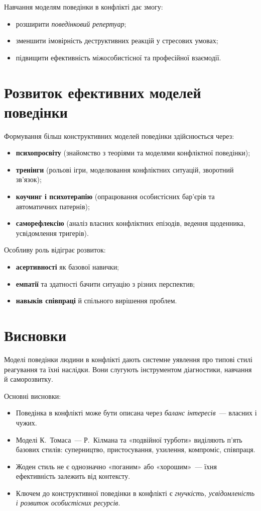 \documentclass[12pt,a4paper]{article}
\begin{document}
    Навчання моделям поведінки в конфлікті дає змогу:
    \begin{itemize}
        \item розширити \textit{поведінковий репертуар};
        \item зменшити імовірність деструктивних реакцій у стресових умовах;
        \item підвищити ефективність міжособистісної та професійної взаємодії.
    \end{itemize}

    \section*{Розвиток ефективних моделей поведінки}
    Формування більш конструктивних моделей поведінки здійснюється через:
    \begin{itemize}
        \item \textbf{психопросвіту} (знайомство з теоріями та моделями конфліктної поведінки);
        \item \textbf{тренінги} (рольові ігри, моделювання конфліктних ситуацій, зворотний зв’язок);
        \item \textbf{коучинг і психотерапію} (опрацювання особистісних бар’єрів та автоматичних патернів);
        \item \textbf{саморефлексію} (аналіз власних конфліктних епізодів, ведення щоденника, усвідомлення тригерів).
    \end{itemize}

    Особливу роль відіграє розвиток:
    \begin{itemize}
        \item \textbf{асертивності} як базової навички;
        \item \textbf{емпатії} та здатності бачити ситуацію з різних перспектив;
        \item \textbf{навыків співпраці} й спільного вирішення проблем.
    \end{itemize}

    \section*{Висновки}
    Моделі поведінки людини в конфлікті дають системне уявлення про типові стилі реагування та їхні наслідки. 
    Вони слугують інструментом діагностики, навчання й саморозвитку.

    Основні висновки:
    \begin{itemize}
        \item Поведінка в конфлікті може бути описана через \textit{баланс інтересів}~--- власних і чужих.
        \item Моделі К.~Томаса~--- Р.~Кілмана та «подвійної турботи» виділяють п’ять базових стилів: суперництво, пристосування, ухилення, компроміс, співпраця.
        \item Жоден стиль не є однозначно «поганим» або «хорошим»~--- їхня ефективність залежить від контексту.
        \item Ключем до конструктивної поведінки в конфлікті є \textit{гнучкість, усвідомленість і розвиток особистісних ресурсів}.
    \end{itemize}
\end{document}
